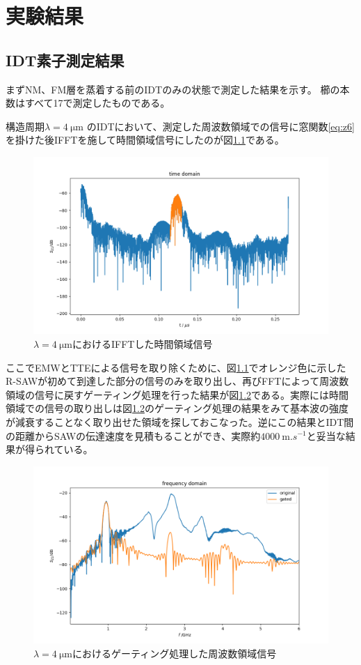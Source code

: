 \documentclass[dvipdfmx,11pt]{jsreport}
\numberwithin{equation}{chapter}
\numberwithin{table}{chapter}
\begin{document}
\chapter{実験結果}
\section{IDT素子測定結果}\label{sidt}
まずNM、FM層を蒸着する前のIDTのみの状態で測定した結果を示す。
櫛の本数はすべて17で測定したものである。

構造周期$\lambda=\SI{4}{\micro \metre}$ のIDTにおいて、測定した周波数領域での信号に窓関数\eqref{eq:z6}を掛けた後IFFTを施して時間領域信号にしたのが図\ref{fig:figdata-idt17-1time-png}である。
\begin{figure}[H]
	\centering
	\includegraphics[width=\textwidth]{figdata/idt17-1time.png}
	\caption{$\lambda=\SI{4}{\micro \metre}$におけるIFFTした時間領域信号}
	\label{fig:figdata-idt17-1time-png}
\end{figure}
ここでEMWとTTEによる信号を取り除くために、図\ref{fig:figdata-idt17-1time-png}でオレンジ色に示したR-SAWが初めて到達した部分の信号のみを取り出し、再びFFTによって周波数領域の信号に戻すゲーティング処理を行った結果が図\ref{fig:figdata-idt17-1-png}である。実際には時間領域での信号の取り出しは図\ref{fig:figdata-idt17-1-png}のゲーティング処理の結果をみて基本波の強度が減衰することなく取り出せた領域を探しておこなった。逆にこの結果とIDT間の距離からSAWの伝達速度を見積もることができ、実際約$\SI{4000}{\metre. s ^{-1}}$と妥当な結果が得られている。
\begin{figure}[H]
	\centering
	\includegraphics[width=\textwidth]{figdata/idt17-1.png}
	\caption{$\lambda=\SI{4}{\micro \metre}$におけるゲーティング処理した周波数領域信号}
	\label{fig:figdata-idt17-1-png}
\end{figure}
\end{document}
